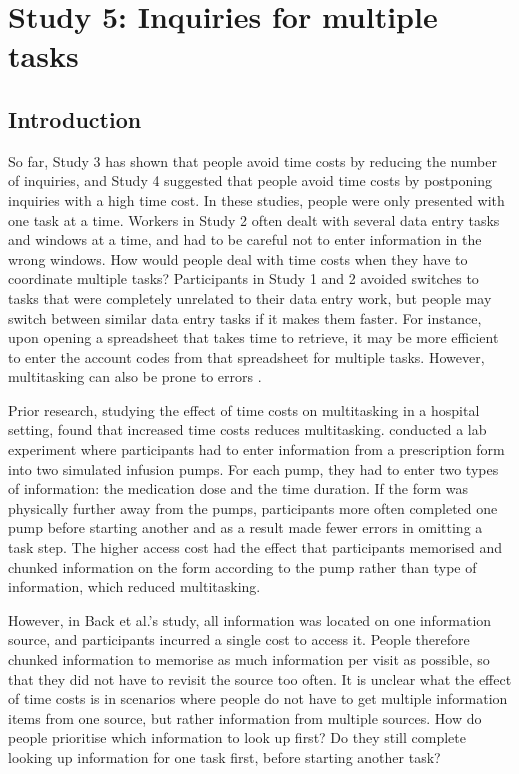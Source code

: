 
\section{Study 5: Inquiries for multiple tasks}
\subsection{Introduction}
So far, Study 3 has shown that people avoid time costs by reducing the number of inquiries, and Study 4 suggested that people avoid time costs by postponing inquiries with a high time cost. In these studies, people were only presented with one task at a time. Workers in Study 2 often dealt with several data entry tasks and windows at a time, and had to be careful not to enter information in the wrong windows. How would people deal with time costs when they have to coordinate multiple tasks? Participants in Study 1 and 2 avoided switches to tasks that were completely unrelated to their data entry work, but people may switch between similar data entry tasks if it makes them faster. For instance, upon opening a spreadsheet that takes time to retrieve, it may be more efficient to enter the account codes from that spreadsheet for multiple tasks. However, multitasking can also be prone to errors \citep{Carrier2015}.

Prior research, studying the effect of time costs on multitasking in a hospital setting, found that increased time costs reduces multitasking. \citet{Back2012} conducted a lab experiment where participants had to enter information from a prescription form into two simulated infusion pumps. For each pump, they had to enter two types of information: the medication dose and the time duration. If the form was physically further away from the pumps, participants more often completed one pump before starting another and as a result made fewer errors in omitting a task step. The higher access cost had the effect that participants memorised and chunked information on the form according to the pump rather than type of information, which reduced multitasking.

However, in Back et al.'s study, all information was located on one information source, and participants incurred a single cost to access it. People therefore chunked information to memorise as much information per visit as possible, so that they did not have to revisit the source too often. It is unclear what the effect of time costs is in scenarios where people do not have to get multiple information items from one source, but rather information from multiple sources. How do people prioritise which information to look up first? Do they still complete looking up information for one task first, before starting another task?

